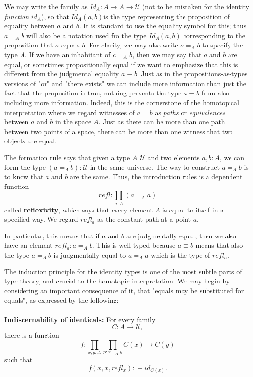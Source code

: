 \documentclass[letterpaper, 10 pt, conference]{ieeeconf}  %
\begin{document}
We may write the family as $Id_A : A \rightarrow A \rightarrow \mathcal{U}$ (not to be mistaken for the identity \textit{function} $id_A$), so that $Id_A(a,b)$is the type representing the proposition of equality between $a$ and $b$. It is standard to use the equality symbol for this; thus $a =_A b$ will also be a notation used fro the type $Id_A(a,b)$ corresponding to the proposition that $a$ equals $b$. For clarity, we may also write $a =_A b$ to specify the type $A$. If we have an inhabitant of $a =_A b$, then we may say that $a$ and $b$ are equal, or sometimes propositionally equal if we want to emphasize that this is different from the judgmental equality $a \equiv b$. Just as in the propositions-as-types versions of "or" and "there exists" we can include more information than just the fact that the proposition is true, nothing prevents the type $a = b$ from also including more information. Indeed, this is the cornerstone of the homotopical interpretation where we regard witnesses of $a = b$ as \textit{paths} or \textit{equivalences} between $a$ and $b$ in the space $A$. Just as there can be more than one path between two points of a space, there can be more than one witness that two objects are equal. 

The formation rule says that given a type $A : \mathcal{U}$ and two elements $a,b : A$, we can form the type $(a =_A b) : \mathcal{U}$ in the same universe. The way to construct $ a =_A b$ is to know that $a$ and $b$ are the same. Thus, the introduction rules is a dependent function 
\begin{equation}
    refl : \prod_{a : A} (a =_A a)
\end{equation}
called \textbf{reflexivity}, which says that every element $A$ is equal to itself in a specified way. We regard $refl_a$ as the constant path at a point $a$.

In particular, this means that if $a$ and $b$ are judgmentally equal, then we also have an element $refl_a : a =_A b$. This is well-typed because $a \equiv b$ means that also the type $a =_A b$ is judgmentally equal to $a =_A a$ which is the type of $refl_a$.

The induction principle for the identity types is one of the most subtle parts of type theory, and crucial to the homotopic interpretation. We may begin by considering an important consequence of it, that "equals may be substituted for equals", as expressed by the following:
\\
\\
\textbf{Indiscernability of identicals:} For every family 
\begin{equation}
    C : A \rightarrow \mathcal{U},
\end{equation}
there is a function 
\begin{equation}
    f : \prod_{x,y : A} \prod_{p: x =_A y} C(x) \rightarrow C(y)
\end{equation}
such that 
\begin{equation}
    f(x,x,refl_x) :\equiv id_{C(x)}.
\end{equation}
\end{document}
